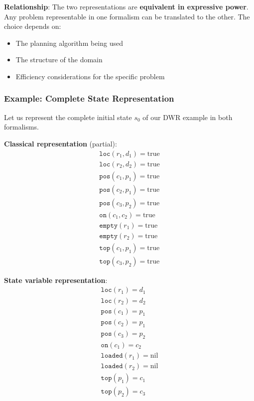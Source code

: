 \documentclass[11pt,a4paper]{article}
\theoremstyle{definition}
\theoremstyle{plain}
\theoremstyle{remark}
\begin{document}
\textbf{Relationship}:
The two representations are \textbf{equivalent in expressive power}. Any problem representable in one formalism can be translated to the other. The choice depends on:
\begin{itemize}
    \item The planning algorithm being used
    \item The structure of the domain
    \item Efficiency considerations for the specific problem
\end{itemize}

\subsubsection{Example: Complete State Representation}

Let us represent the complete initial state $s_0$ of our DWR example in both formalisms.

\textbf{Classical representation} (partial):
\[
\begin{array}{l}
\texttt{loc}(r_1, d_1) = \text{true} \\
\texttt{loc}(r_2, d_2) = \text{true} \\
\texttt{pos}(c_1, p_1) = \text{true} \\
\texttt{pos}(c_2, p_1) = \text{true} \\
\texttt{pos}(c_3, p_2) = \text{true} \\
\texttt{on}(c_1, c_2) = \text{true} \\
\texttt{empty}(r_1) = \text{true} \\
\texttt{empty}(r_2) = \text{true} \\
\texttt{top}(c_1, p_1) = \text{true} \\
\texttt{top}(c_3, p_2) = \text{true}
\end{array}
\]

\textbf{State variable representation}:
\[
\begin{array}{l}
\texttt{loc}(r_1) = d_1 \\
\texttt{loc}(r_2) = d_2 \\
\texttt{pos}(c_1) = p_1 \\
\texttt{pos}(c_2) = p_1 \\
\texttt{pos}(c_3) = p_2 \\
\texttt{on}(c_1) = c_2 \\
\texttt{loaded}(r_1) = \text{nil} \\
\texttt{loaded}(r_2) = \text{nil} \\
\texttt{top}(p_1) = c_1 \\
\texttt{top}(p_2) = c_3
\end{array}
\]
\end{document}
